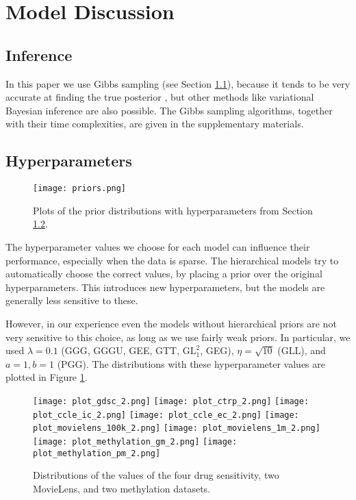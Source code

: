 \documentclass[letterpaper]{article} %
\begin{document}
\section{Model Discussion} 
	\subsection{Inference} \label{Inference}
		In this paper we use Gibbs sampling (see Section \ref{Inference}), because it tends to be very accurate at finding the true posterior \cite{Brouwer2017b}, but other methods like variational Bayesian inference are also possible. The Gibbs sampling algorithms, together with their time complexities, are given in the supplementary materials.
		
	\subsection{Hyperparameters} \label{Hyperparameters}
		\begin{figure}[t]
			\centering
			\texttt{[image: priors.png]}
			\caption{Plots of the prior distributions with hyperparameters from Section \ref{Hyperparameters}.}
			\label{priors_plot}
		\end{figure}
	
		The hyperparameter values we choose for each model can influence their performance, especially when the data is sparse. The hierarchical models try to automatically choose the correct values, by placing a prior over the original hyperparameters. This introduces new hyperparameters, but the models are generally less sensitive to these. 
		
		However, in our experience even the models without hierarchical priors are not very sensitive to this choice, as long as we use fairly weak priors. In particular, we used $\lambda = 0.1$ (GGG, GGGU, GEE, GTT, $\text{GL}^2_1$, GEG), $\eta = \sqrt{10}$ (GLL), and $a = 1, b = 1$ (PGG). The distributions with these hyperparameter values are plotted in Figure \ref{priors_plot}.
		
	\begin{figure*}[t]
		\centering
		\texttt{[image: plot\_gdsc\_2.png]}
		\texttt{[image: plot\_ctrp\_2.png]}
		\texttt{[image: plot\_ccle\_ic\_2.png]}
		\texttt{[image: plot\_ccle\_ec\_2.png]}
		\texttt{[image: plot\_movielens\_100k\_2.png]}
		\texttt{[image: plot\_movielens\_1m\_2.png]}
		\texttt{[image: plot\_methylation\_gm\_2.png]}
		\texttt{[image: plot\_methylation\_pm\_2.png]}
		\caption{Distributions of the values of the four drug sensitivity, two MovieLens, and two methylation datasets.} %
		\label{dataset_plots}
	\end{figure*}
\end{document}
